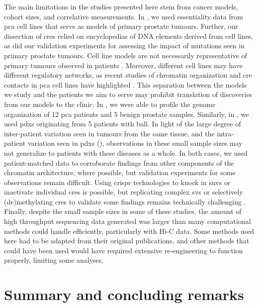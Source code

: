The main limitations in the studies presented here stem from cancer models, cohort sizes, and correlative measurements.
In , we used essentiality data from \gls{pca} cell lines that serve as models of primary prostate tumours.
Further, our dissection of \glspl{cre} relied on encyclopedias of DNA elements derived from cell lines, as did our validation experiments for assessing the impact of mutations seen in primary prostate tumours.
Cell line models are not necessarily representative of primary tumours observed in patients \cite{domckeCompetitionDNAMethylation2015,ghandiNextgenerationCharacterizationCancer2019}.
Moreover, different cell lines may have different regulatory networks, as recent studies of chromatin organization and \gls{cre} contacts in \gls{pca} cell lines have highlighted \cite{ahmedCRISPRiScreensReveal2021}.
This separation between the models we study and the patients we aim to serve may prohibit translation of discoveries from our models to the clinic.
In , we were able to profile the genome organization of 12 \gls{pca} patients and 5 benign prostate samples.
Similarly, in , we used \glspl{pdx} originating from 5 patients with \gls{ball}.
In light of the large degree of inter-patient variation seen in tumours from the same tissue, and the intra-patient variation seen in \glspl{pdx} (), observations in these small sample sizes may not generalize to patients with these diseases as a whole.
In both cases, we used patient-matched data to corroborate findings from other components of the chromatin architecture, where possible, but validation experiments for some observations remain difficult.
Using \gls{crispr} technologies to knock in \glspl{snv} or inactivate individual \glspl{cre} is possible, but replicating complex \glspl{sv} or selectively (de)methylating \glspl{cre} to validate some findings remains technically challenging \cite{nakamuraCRISPRTechnologiesPrecise2021,pickar-oliverNextGenerationCRISPR2019,wangEngineering3DGenome2021}.
Finally, despite the small sample sizes in some of these studies, the amount of high throughput sequencing data generated was larger than many computational methods could handle efficiently, particularly with Hi-C data.
Some methods used here had to be adapted from their original publications, and other methods that could have been used would have required extensive re-engineering to function properly, limiting some analyses.

\section{Summary and concluding remarks}

